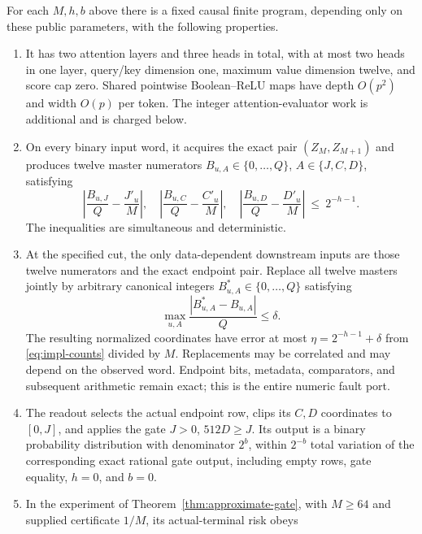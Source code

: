 \begin{theorem}\label{thm:finite-realization}
For each $M,h,b$ above there is a fixed causal finite program, depending
only on these public parameters, with the following properties.
\begin{enumerate}
\item It has two attention layers and three heads in total, with at most
 two heads in one layer, query/key dimension one, maximum value dimension
 twelve, and score cap zero. Shared pointwise Boolean--ReLU maps have
 depth $O(p^2)$ and width $O(p)$ per token. The integer attention-evaluator
 work is additional and is charged below.
\item On every binary input word, it acquires the exact pair
 $(Z_M,Z_{M+1})$ and produces twelve master numerators
 $B_{u,A}\in\{0,\ldots,Q\}$, $A\in\{J,C,D\}$, satisfying
 \begin{equation}\label{eq:impl-bank-error}
 \left|\frac{B_{u,J}}Q-\frac{J'_u}M\right|,
 \quad\left|\frac{B_{u,C}}Q-\frac{C'_u}M\right|,
 \quad\left|\frac{B_{u,D}}Q-\frac{D'_u}M\right|
 \ \le\ 2^{-h-1}.
 \end{equation}
 The inequalities are simultaneous and deterministic.
\item At the specified cut, the only data-dependent downstream inputs
 are those twelve numerators and the exact endpoint pair. Replace all
 twelve masters jointly by arbitrary canonical integers
 $B^*_{u,A}\in\{0,\ldots,Q\}$ satisfying
 \begin{equation}\label{eq:impl-port}
 \max_{u,A}\frac{|B^*_{u,A}-B_{u,A}|}{Q}\le\delta.
 \end{equation}
 The resulting normalized coordinates have error at most
 $\eta=2^{-h-1}+\delta$ from \eqref{eq:impl-counts} divided by $M$.
 Replacements may be correlated and may depend on the observed word.
 Endpoint bits, metadata, comparators, and subsequent arithmetic remain
 exact; this is the entire numeric fault port.
\item The readout selects the actual endpoint row, clips its $C,D$
 coordinates to $[0,J]$, and applies the gate $J>0$, $512D\ge J$.
 Its output is a binary probability distribution with denominator $2^b$,
 within $2^{-b}$ total variation of the corresponding exact rational gate
 output, including empty rows, gate equality, $h=0$, and $b=0$.
\item In the experiment of Theorem~\ref{thm:approximate-gate}, with
 $M\ge64$ and supplied certificate $1/M$, its actual-terminal risk obeys

\end{enumerate}
\end{theorem}
